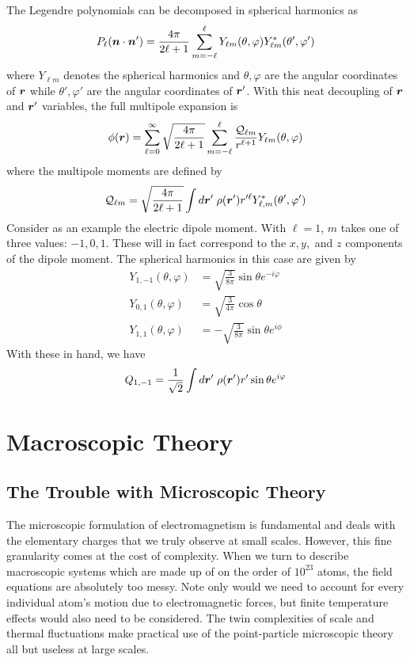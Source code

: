 \documentclass[twocolumn]{gwclass}
\begin{document}
	The Legendre polynomials can be decomposed in spherical harmonics as
	$$ P_\ell(\boldsymbol{n}\cdot\boldsymbol{n}') = \frac{4\pi}{2\ell+1}\sum_{m=-\ell}^\ell Y_{\ell m}(\theta,\varphi)Y_{\ell m}^*(\theta',\varphi') $$
	where $Y_{\ell m}$ denotes the spherical harmonics and $\theta,\varphi$ are the angular coordinates of $\boldsymbol{r}$ while $\theta',\varphi'$ are the angular coordinates of $\boldsymbol{r}'$. With this neat decoupling of $\boldsymbol{r}$ and $\boldsymbol{r}'$ variables, the full multipole expansion is
	$$ \phi(\boldsymbol{r}) = \sum_{\ell=0}^\infty \sqrt{\frac{4\pi}{2\ell+1}}\sum_{m=-\ell}^\ell \frac{\mathcal{Q}_{\ell m}}{r^{\ell+1}}Y_{\ell m}(\theta,\varphi) $$
	where the multipole moments are defined by
	$$ \mathcal{Q}_{\ell m} = \sqrt{\frac{4\pi}{2\ell+1}}\int d\boldsymbol{r}'\;\rho(\boldsymbol{r}')r'^\ell Y^*_{\ell,m}(\theta',\varphi') $$
	Consider as an example the electric dipole moment. With $\ell=1$, $m$ takes one of three values: $-1,0,1$. These will in fact correspond to the $x,y,$ and $z$ components of the dipole moment. The spherical harmonics in this case are given by
	\begin{align*}
		Y_{1,-1}(\theta,\varphi) &= \sqrt{\frac{3}{8\pi}}\sin\theta e^{-i\varphi} \\
		Y_{0,1}(\theta,\varphi) &= \sqrt{\frac{3}{4\pi}}\cos\theta \\
		Y_{1,1}(\theta,\varphi) &= -\sqrt{\frac{3}{8\pi}}\sin\theta e^{i\phi}
	\end{align*}
	With these in hand, we have
	\begin{align*}
		Q_{1,-1} &= \frac{1}{\sqrt{2}}\int d\boldsymbol{r}'\;\rho(\boldsymbol{r}')r'\sin\theta e^{i\varphi} \\
	\end{align*}
	
	\section{Macroscopic Theory}
	\subsection{The Trouble with Microscopic Theory}
	The microscopic formulation of electromagnetism is fundamental and deals with the elementary charges that we truly observe at small scales. However, this fine granularity comes at the cost of complexity. When we turn to describe macroscopic systems which are made up of on the order of $10^{23}$ atoms, the field equations are absolutely too messy. Note only would we need to account for every individual atom's motion due to electromagnetic forces, but finite temperature effects would also need to be considered. The twin complexities of scale and thermal fluctuations make practical use of the point-particle microscopic theory all but useless at large scales. 
	
\end{document}
